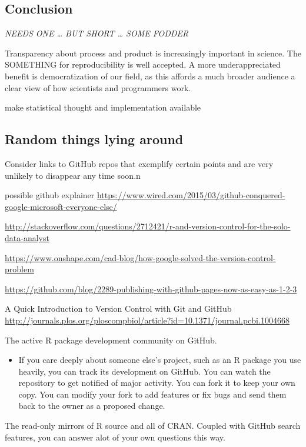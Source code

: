 \documentclass[12pt]{article}
\providecommand{\tightlist}{%
  \setlength{\itemsep}{0pt}\setlength{\parskip}{0pt}}
\begin{document}
\subsection{Conclusion}\label{conclusion}

\emph{NEEDS ONE \ldots{} BUT SHORT \ldots{} SOME FODDER}

Transparency about process and product is increasingly important in
science. The SOMETHING for reproducibility is well accepted. A more
underappreciated benefit is democratization of our field, as this
affords a much broader audience a clear view of how scientists and
programmers work.

make statistical thought and implementation available

\subsection{Random things lying
around}\label{random-things-lying-around}

Consider links to GitHub repos that exemplify certain points and are
very unlikely to disappear any time soon.n

possible github explainer
\url{https://www.wired.com/2015/03/github-conquered-google-microsoft-everyone-else/}

\url{http://stackoverflow.com/questions/2712421/r-and-version-control-for-the-solo-data-analyst}

\url{https://www.onshape.com/cad-blog/how-google-solved-the-version-control-problem}

\url{https://github.com/blog/2289-publishing-with-github-pages-now-as-easy-as-1-2-3}

A Quick Introduction to Version Control with Git and GitHub
\url{http://journals.plos.org/ploscompbiol/article?id=10.1371/journal.pcbi.1004668}

The active R package development community on GitHub.

\begin{itemize}
\tightlist
\item
  If you care deeply about someone else's project, such as an R package
  you use heavily, you can track its development on GitHub. You can
  watch the repository to get notified of major activity. You can fork
  it to keep your own copy. You can modify your fork to add features or
  fix bugs and send them back to the owner as a proposed change.
\end{itemize}

The read-only mirrors of R source and all of CRAN. Coupled with GitHub
search features, you can answer alot of your own questions this way.
\end{document}
